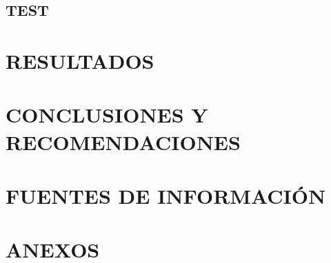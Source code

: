 \documentclass[a4paper,12pt]{report}
\begin{document}
			\section {TEST }
				
			
		
		\chapter {RESULTADOS}
		
		\chapter {CONCLUSIONES Y RECOMENDACIONES}
		
		\chapter {FUENTES DE INFORMACIÓN}
		
		\chapter {ANEXOS}
\end{document}
